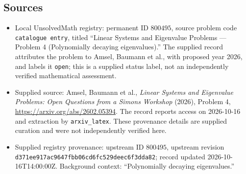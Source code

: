 \documentclass[11pt]{article}
\begin{document}
\subsection{Sources}
\begin{itemize}
\item Local UnsolvedMath registry: permanent ID \(800495\), source problem code \texttt{catalogue entry}, titled ``Linear Systems and Eigenvalue Problems --- Problem 4 (Polynomially decaying eigenvalues).'' The supplied record attributes the problem to Amsel, Baumann et al., with proposed year 2026, and labels it \texttt{open}; this is a supplied status label, not an independently verified mathematical assessment.
\item Supplied source: Amsel, Baumann et al., \emph{Linear Systems and Eigenvalue Problems: Open Questions from a Simons Workshop} (2026), Problem 4, \url{https://arxiv.org/abs/2602.05394}. The record reports access on 2026-10-16 and extraction by \texttt{arxiv\_latex}. These provenance details are supplied curation and were not independently verified here.
\item Supplied registry provenance: upstream ID \(800495\), upstream revision \texttt{d371ee917ac9647fbb06cd6fc529deec6f3dda82}; record updated 2026-10-16T14:00:00Z. Background context: ``Polynomially decaying eigenvalues.''
\end{itemize}
\end{document}
